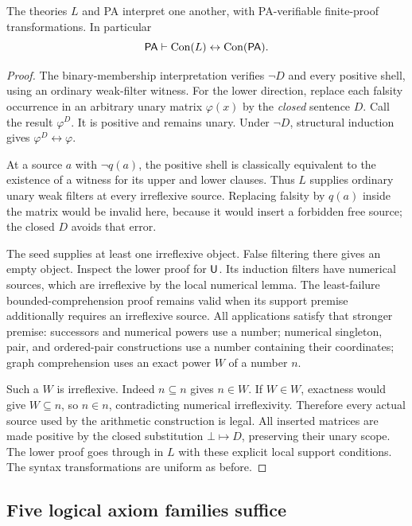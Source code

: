 \begin{theorem}\label{thm:positive-unary}
The theories $L$ and PA interpret one another, with PA-verifiable finite-proof transformations. In particular
\[
                   \mathsf{PA}\vdash\operatorname{Con}(L)\leftrightarrow\operatorname{Con}(\mathsf{PA}).
\]
\end{theorem}
\begin{proof}
The binary-membership interpretation verifies $\neg D$ and every positive shell, using an ordinary weak-filter witness. For the lower direction, replace each falsity occurrence in an arbitrary unary matrix $\varphi(x)$ by the \emph{closed} sentence $D$. Call the result $\varphi^D$. It is positive and remains unary. Under $\neg D$, structural induction gives $\varphi^D\leftrightarrow\varphi$.

At a source $a$ with $\neg q(a)$, the positive shell is classically equivalent to the existence of a witness for its upper and lower clauses. Thus $L$ supplies ordinary unary weak filters at every irreflexive source. Replacing falsity by $q(a)$ inside the matrix would be invalid here, because it would insert a forbidden free source; the closed $D$ avoids that error.

The seed supplies at least one irreflexive object. False filtering there gives an empty object. Inspect the lower proof for $\mathsf{U}$. Its induction filters have numerical sources, which are irreflexive by the local numerical lemma. The least-failure bounded-comprehension proof remains valid when its support premise additionally requires an irreflexive source. All applications satisfy that stronger premise: successors and numerical powers use a number; numerical singleton, pair, and ordered-pair constructions use a number containing their coordinates; graph comprehension uses an exact power $W$ of a number $n$.

Such a $W$ is irreflexive. Indeed $n\subseteq n$ gives $n\in W$. If $W\in W$, exactness would give $W\subseteq n$, so $n\in n$, contradicting numerical irreflexivity. Therefore every actual source used by the arithmetic construction is legal. All inserted matrices are made positive by the closed substitution $\bot\mapsto D$, preserving their unary scope. The lower proof goes through in $L$ with these explicit local support conditions. The syntax transformations are uniform as before.
\end{proof}

\subsection{Five logical axiom families suffice}

